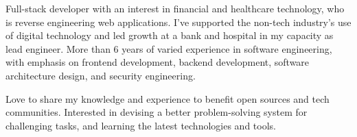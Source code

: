 

\begin{cvparagraph}

Full-stack developer with an interest in financial and healthcare technology, who is reverse engineering web applications. I've supported the non-tech industry's use of digital technology and led growth at a bank and hospital in my capacity as lead engineer. More than 6 years of varied experience in software engineering, with emphasis on frontend development, backend development, software architecture design, and security engineering.

Love to share my knowledge and experience to benefit open sources and tech communities. Interested in devising a better problem-solving system for challenging tasks, and learning the latest technologies and tools.
\end{cvparagraph}
